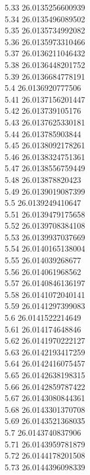 {5.33	26.0135256600939\\
5.34	26.0135496089502\\
5.35	26.0135734992082\\
5.36	26.0135973310466\\
5.37	26.0136211046432\\
5.38	26.0136448201752\\
5.39	26.0136684778191\\
5.4	26.0136920777506\\
5.41	26.0137156201447\\
5.42	26.013739105176\\
5.43	26.0137625330181\\
5.44	26.013785903844\\
5.45	26.0138092178261\\
5.46	26.0138324751361\\
5.47	26.0138556759449\\
5.48	26.013878820423\\
5.49	26.0139019087399\\
5.5	26.0139249410647\\
5.51	26.0139479175658\\
5.52	26.0139708384108\\
5.53	26.0139937037669\\
5.54	26.0140165138004\\
5.55	26.014039268677\\
5.56	26.014061968562\\
5.57	26.0140846136197\\
5.58	26.0141072040141\\
5.59	26.0141297399083\\
5.6	26.0141522214649\\
5.61	26.014174648846\\
5.62	26.0141970222127\\
5.63	26.0142193417259\\
5.64	26.0142416075457\\
5.65	26.0142638198315\\
5.66	26.0142859787422\\
5.67	26.0143080844361\\
5.68	26.0143301370708\\
5.69	26.0143521368035\\
5.7	26.0143740837906\\
5.71	26.0143959781879\\
5.72	26.0144178201508\\
5.73	26.0144396098339\\
}
